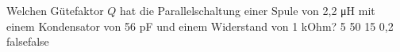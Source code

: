     {Welchen Gütefaktor $Q$ hat die Parallelschaltung einer Spule von 2,2 μH mit einem Kondensator von 56 pF und einem Widerstand von 1 kOhm?}
    {5}
    {50}
    {15}
    {0,2}
    {false}{false}